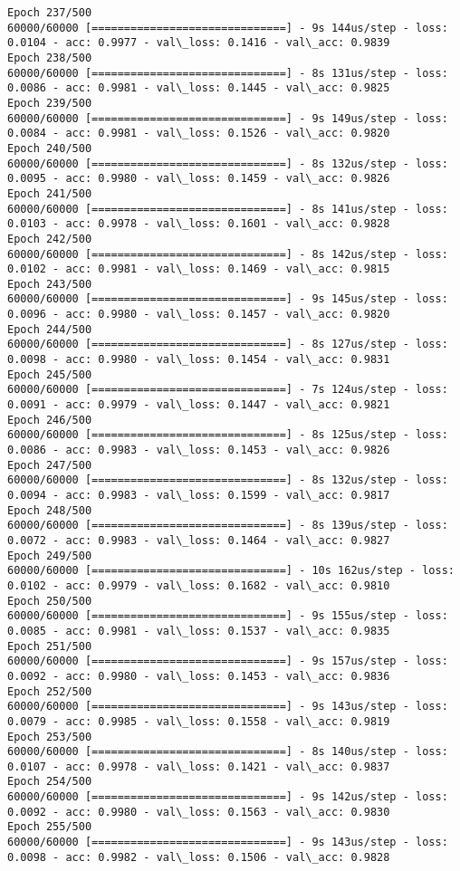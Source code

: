 \documentclass[11pt]{article}
\begin{document}
\begin{Verbatim}[commandchars=\\\{\}]
Epoch 237/500
60000/60000 [==============================] - 9s 144us/step - loss: 0.0104 - acc: 0.9977 - val\_loss: 0.1416 - val\_acc: 0.9839
Epoch 238/500
60000/60000 [==============================] - 8s 131us/step - loss: 0.0086 - acc: 0.9981 - val\_loss: 0.1445 - val\_acc: 0.9825
Epoch 239/500
60000/60000 [==============================] - 9s 149us/step - loss: 0.0084 - acc: 0.9981 - val\_loss: 0.1526 - val\_acc: 0.9820
Epoch 240/500
60000/60000 [==============================] - 8s 132us/step - loss: 0.0095 - acc: 0.9980 - val\_loss: 0.1459 - val\_acc: 0.9826
Epoch 241/500
60000/60000 [==============================] - 8s 141us/step - loss: 0.0103 - acc: 0.9978 - val\_loss: 0.1601 - val\_acc: 0.9828
Epoch 242/500
60000/60000 [==============================] - 8s 142us/step - loss: 0.0102 - acc: 0.9981 - val\_loss: 0.1469 - val\_acc: 0.9815
Epoch 243/500
60000/60000 [==============================] - 9s 145us/step - loss: 0.0096 - acc: 0.9980 - val\_loss: 0.1457 - val\_acc: 0.9820
Epoch 244/500
60000/60000 [==============================] - 8s 127us/step - loss: 0.0098 - acc: 0.9980 - val\_loss: 0.1454 - val\_acc: 0.9831
Epoch 245/500
60000/60000 [==============================] - 7s 124us/step - loss: 0.0091 - acc: 0.9979 - val\_loss: 0.1447 - val\_acc: 0.9821
Epoch 246/500
60000/60000 [==============================] - 8s 125us/step - loss: 0.0086 - acc: 0.9983 - val\_loss: 0.1453 - val\_acc: 0.9826
Epoch 247/500
60000/60000 [==============================] - 8s 132us/step - loss: 0.0094 - acc: 0.9983 - val\_loss: 0.1599 - val\_acc: 0.9817
Epoch 248/500
60000/60000 [==============================] - 8s 139us/step - loss: 0.0072 - acc: 0.9983 - val\_loss: 0.1464 - val\_acc: 0.9827
Epoch 249/500
60000/60000 [==============================] - 10s 162us/step - loss: 0.0102 - acc: 0.9979 - val\_loss: 0.1682 - val\_acc: 0.9810
Epoch 250/500
60000/60000 [==============================] - 9s 155us/step - loss: 0.0085 - acc: 0.9981 - val\_loss: 0.1537 - val\_acc: 0.9835
Epoch 251/500
60000/60000 [==============================] - 9s 157us/step - loss: 0.0092 - acc: 0.9980 - val\_loss: 0.1453 - val\_acc: 0.9836
Epoch 252/500
60000/60000 [==============================] - 9s 143us/step - loss: 0.0079 - acc: 0.9985 - val\_loss: 0.1558 - val\_acc: 0.9819
Epoch 253/500
60000/60000 [==============================] - 8s 140us/step - loss: 0.0107 - acc: 0.9978 - val\_loss: 0.1421 - val\_acc: 0.9837
Epoch 254/500
60000/60000 [==============================] - 9s 142us/step - loss: 0.0092 - acc: 0.9980 - val\_loss: 0.1563 - val\_acc: 0.9830
Epoch 255/500
60000/60000 [==============================] - 9s 143us/step - loss: 0.0098 - acc: 0.9982 - val\_loss: 0.1506 - val\_acc: 0.9828

\end{Verbatim}
\end{document}
